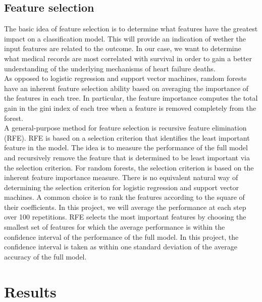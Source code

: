 \documentclass[notitlepage, reprint, nofootinbib]{revtex4-1}
\begin{document}
\subsection{Feature selection}
The basic idea of feature selection is to determine what features have the greatest impact on a classification model. This will provide an indication of wether the input features are related to the outcome. In our case, we want to determine what medical records are most correlated with survival in order to gain a better understanding of the underlying mechanisms of heart failure deaths. \\[2mm]
As opposed to logistic regression and support vector machines, random forests have an inherent feature selection ability based on averaging the importance of the features in each tree. In particular, the feature importance computes the total gain in the gini index of each tree when a feature is removed completely from the forest. \\[2mm]
A general-purpose method for feature selection is recursive feature elimination (RFE). RFE is based on a selection criterion that identifies the least important feature in the model. The idea is to measure the performance of the full model and recursively remove the feature that is determined to be least important via the selection criterion. For random forests, the selection criterion is based on the inherent feature importance measure. There is no equivalent natural way of determining the selection criterion for logistic regression and support vector machines. A common choice is to rank the features according to the square of their coefficients. In this project, we will average the performance at each step over 100 repetitions. RFE selects the most important features by choosing the smallest set of features for which the average performance is within the confidence interval of the performance of the full model. In this project, the confidence interval is taken as within one standard deviation of the average accuracy of the full model. 
\section{Results}
\end{document}
